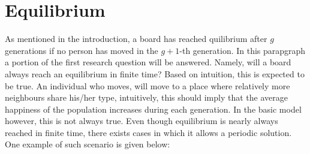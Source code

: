 
\section{Equilibrium}\label{sec:equi}
As mentioned in the introduction, a board has reached quilibrium after $g$ generations if no  person has moved in the $g+1$-th generation.
In this parapgraph a portion of the first research question will be answered. Namely, will a board always reach an equilibrium in finite time? 
Based on intuition, this is expected to be true.
An individual who moves, will move to a place where relatively more neighbours share his/her type, intuitively, this should imply that the average happiness of the population increases during each generation. 
In the basic model however, this is not always true. 
Even though equilibrium is nearly always reached in finite time, there exists cases in which it allows a periodic solution. 
One example of such scenario is given below:

